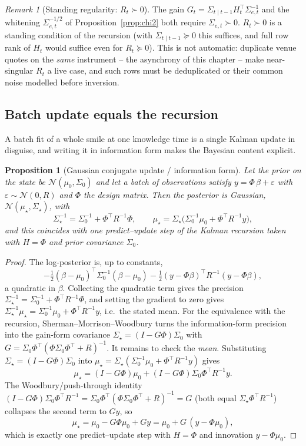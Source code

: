 \documentclass[11pt]{book}
\theoremstyle{plain}
\newtheorem{proposition}[theorem]{Proposition}
\theoremstyle{definition}
\theoremstyle{remark}
\newtheorem{remark}[theorem]{Remark}
\newcommand{\ncdf}{N}                            %
\newcommand{\Nrm}{\mathcal{N}}                   %
\begin{document}
\begin{remark}[Standing regularity: $R_t\succ0$]
The gain $G_t=\Sigma_{t\mid t-1}H_t^{\top}\Sigma_{e,t}^{-1}$ and the whitening
$\Sigma_{e,t}^{-1/2}$ of Proposition~\ref{prop:chi2} both require
$\Sigma_{e,t}\succ0$. $R_t\succ0$ is a standing condition of the
recursion (with $\Sigma_{t\mid t-1}\succeq0$ this suffices, and full row rank of
$H_t$ would suffice even for $R_t\succeq0$). This is not automatic: duplicate
venue quotes on the \emph{same} instrument -- the asynchrony of this chapter
-- make near-singular $R_t$ a live case, and such rows must be deduplicated or
their common noise modelled before inversion.
\end{remark}

\subsection{Batch update equals the recursion}

A batch fit of a whole smile at one knowledge time is a single Kalman update in
disguise, and writing it in information form makes the Bayesian content explicit.

\begin{proposition}[Gaussian conjugate update / information form]
\label{prop:batch}
Let the prior on the state be $\Nrm(\mu_0,\Sigma_0)$ and let a batch of
observations satisfy $y=\Phi\,\beta+\varepsilon$ with $\varepsilon\sim\Nrm(0,R)$
and $\Phi$ the design matrix. Then the posterior is Gaussian,
$\Nrm(\mu_\star,\Sigma_\star)$, with
\[
    \Sigma_\star^{-1} = \Sigma_0^{-1} + \Phi^{\top}R^{-1}\Phi,
    \qquad
    \mu_\star = \Sigma_\star
    \bigl(\Sigma_0^{-1}\mu_0 + \Phi^{\top}R^{-1}y\bigr),
\]
and this coincides with one predict--update step of the Kalman recursion taken
with $H=\Phi$ and prior covariance $\Sigma_0$.
\end{proposition}

\begin{proof}
The log-posterior is, up to constants,
\[
    -\tfrac12(\beta-\mu_0)^{\top}\Sigma_0^{-1}(\beta-\mu_0)
    -\tfrac12(y-\Phi\beta)^{\top}R^{-1}(y-\Phi\beta),
\]
a quadratic in $\beta$. Collecting the quadratic term gives the precision
$\Sigma_\star^{-1}=\Sigma_0^{-1}+\Phi^{\top}R^{-1}\Phi$, and setting the gradient
to zero gives
$\Sigma_\star^{-1}\mu_\star=\Sigma_0^{-1}\mu_0+\Phi^{\top}R^{-1}y$, i.e.\ the
stated mean. For the equivalence with the recursion, Sherman--Morrison--Woodbury
turns the information-form precision into the gain-form covariance
$\Sigma_\star=(I-G\Phi)\Sigma_0$ with
$G=\Sigma_0\Phi^{\top}(\Phi\Sigma_0\Phi^{\top}+R)^{-1}$. It remains to check the
\emph{mean}. Substituting $\Sigma_\star=(I-G\Phi)\Sigma_0$ into
$\mu_\star=\Sigma_\star(\Sigma_0^{-1}\mu_0+\Phi^{\top}R^{-1}y)$ gives
\[
    \mu_\star = (I-G\Phi)\mu_0 + (I-G\Phi)\Sigma_0\Phi^{\top}R^{-1}y .
\]
The Woodbury/push-through identity
$(I-G\Phi)\Sigma_0\Phi^{\top}R^{-1}=\Sigma_0\Phi^{\top}(\Phi\Sigma_0\Phi^{\top}+R)^{-1}=G$
(both equal $\Sigma_\star\Phi^{\top}R^{-1}$) collapses the second term to $Gy$,
so
\[
    \mu_\star = \mu_0 - G\Phi\mu_0 + Gy = \mu_0 + G\,(y-\Phi\mu_0),
\]
which is exactly one predict--update step with $H=\Phi$ and innovation
$y-\Phi\mu_0$.
\end{proof}
\end{document}
